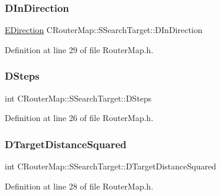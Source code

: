 \subsubsection{\texorpdfstring{D\+In\+Direction}{DInDirection}}
{\footnotesize\ttfamily \hyperlink{GameDataTypes_8h_acb2b033915f6659a71a38b5aa6e4eb42}{E\+Direction} C\+Router\+Map\+::\+S\+Search\+Target\+::\+D\+In\+Direction}



Definition at line 29 of file Router\+Map.\+h.

\hypertarget{structCRouterMap_1_1SSearchTarget_aa6f669010893468be9c8c3599d4d1909}{}\label{structCRouterMap_1_1SSearchTarget_aa6f669010893468be9c8c3599d4d1909} 
\subsubsection{\texorpdfstring{D\+Steps}{DSteps}}
{\footnotesize\ttfamily int C\+Router\+Map\+::\+S\+Search\+Target\+::\+D\+Steps}



Definition at line 26 of file Router\+Map.\+h.

\hypertarget{structCRouterMap_1_1SSearchTarget_a0a3164fdaa28c8b76422ce844dc843a0}{}\label{structCRouterMap_1_1SSearchTarget_a0a3164fdaa28c8b76422ce844dc843a0} 
\subsubsection{\texorpdfstring{D\+Target\+Distance\+Squared}{DTargetDistanceSquared}}
{\footnotesize\ttfamily int C\+Router\+Map\+::\+S\+Search\+Target\+::\+D\+Target\+Distance\+Squared}



Definition at line 28 of file Router\+Map.\+h.

\hypertarget{structCRouterMap_1_1SSearchTarget_a20598a9fd12e7a87ecd920931797b269}{}\label{structCRouterMap_1_1SSearchTarget_a20598a9fd12e7a87ecd920931797b269} 

